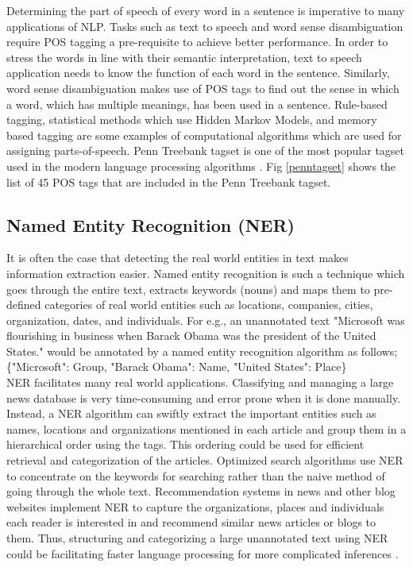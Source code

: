 	
	Determining the part of speech of every word in a sentence is imperative to many applications of NLP. Tasks such as text to speech and word sense disambiguation require POS tagging a pre-requisite to achieve better performance. In order to stress the words in line with their semantic interpretation, text to speech application needs to know the function of each word in the sentence. Similarly, word sense disambiguation makes use of POS tags to find out the sense in which a word, which has multiple meanings, has been used in a sentence. Rule-based tagging, statistical methods which use Hidden Markov Models, and memory based tagging are some examples of computational algorithms which are used for assigning parts-of-speech. Penn Treebank tagset is one of the most popular tagset used in the modern language processing algorithms \cite{jurafsky2014speech}. Fig \ref{penntagset} shows the list of 45 POS tags that are included in the Penn Treebank tagset.
	
	\subsection{Named Entity Recognition (NER)}
	
	It is often the case that detecting the real world entities in text makes information extraction easier. Named entity recognition is such a technique which goes through the entire text, extracts keywords (nouns) and maps them to pre-defined categories of real world entities such as locations, companies, cities, organization, dates, and individuals. For e.g., an unannotated text "Microsoft was flourishing in business when Barack Obama was the president of the United States." would be annotated by a named entity recognition algorithm as follows; \\
	
	\{"Microsoft": Group, "Barack Obama": Name, "United States": Place\} \\
	
	NER facilitates many real world applications. Classifying and managing a large news database is very time-consuming and error prone when it is done manually. Instead, a NER algorithm can swiftly extract the important entities such as names, locations and organizations mentioned in each article and group them in a hierarchical order using the tags. This ordering could be used for efficient retrieval and categorization of the articles. Optimized search algorithms use NER to concentrate on the keywords for searching rather than the naive method of going through the whole text. Recommendation systems in news and other blog websites implement NER to capture the organizations, places and individuals each reader is interested in and recommend similar news articles or blogs to them. Thus, structuring and categorizing a large unannotated text using NER could be facilitating faster language processing for more complicated inferences \cite{ner_blog}.
	
